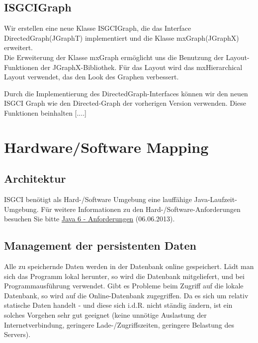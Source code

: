 \documentclass[10pt,a4paper]{article}
\begin{document}
\subsection{ISGCIGraph}
Wir erstellen eine neue Klasse ISGCIGraph, die das Interface DirectedGraph(JGraphT) implementiert und die Klasse mxGraph(JGraphX) erweitert.\\
Die Erweiterung der Klasse mxGraph ermöglicht uns die Benutzung der Layout-Funktionen der JGraphX-Bibliothek. Für das Layout wird das mxHierarchical Layout verwendet, das den Look des Graphen verbessert. 


Durch die Implementierung des DirectedGraph-Interfaces können wir den neuen ISGCI Graph wie den Directed-Graph der vorherigen Version verwenden. Diese Funktionen beinhalten [....]




\newpage
\section{Hardware/Software Mapping}
\subsection{Architektur}
ISGCI benötigt als Hard-/Software Umgebung eine lauffähige Java-Laufzeit-Umgebung. Für weitere Informationen zu den Hard-/Software-Anforderungen besuchen Sie bitte 
\href{http://www.oracle.com/technetwork/java/javase/system-configurations-135212.html}{Java 6 - Anforderungen} (06.06.2013).

\subsection{Management der persistenten Daten}
Alle zu speichernde Daten werden in der Datenbank online gespeichert. Lädt man sich das Programm lokal herunter, so wird die Datenbank mitgeliefert, und bei Programmausführung verwendet. Gibt es Probleme beim Zugriff auf die lokale Datenbank, so wird auf die Online-Datenbank zugegriffen. Da es sich um relativ statische Daten handelt - und diese sich i.d.R. nicht ständig ändern, ist ein solches Vorgehen sehr gut geeignet (keine unnötige Auslastung der Internetverbindung, geringere Lade-/Zugriffszeiten, geringere Belastung des Servers). 

\end{document}
